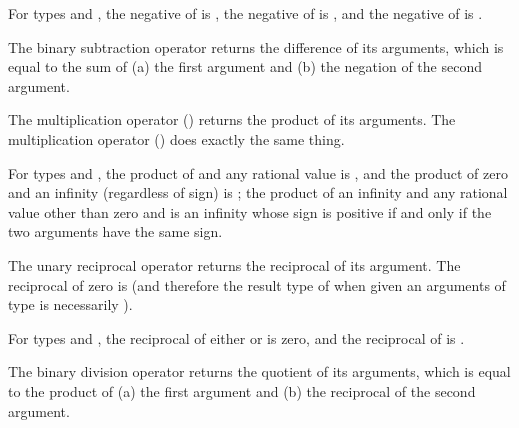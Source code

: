 For types  and , the negative of
\EXP{+\infty} is \EXP{-\infty}, the negative of \EXP{-\infty} is \EXP{+\infty},
and the negative of  is .



The binary subtraction operator \EXP{-} returns the difference of its arguments,
which is equal to the sum of (a) the first argument and (b) the negation of the second argument.



The multiplication operator \EXP{\cdot} () returns the product of its arguments.
The multiplication operator \EXP{\times} () does exactly the same thing.

For types  and , the product of
 and any rational value is , and the product of
zero and an infinity (regardless of sign) is ;
the product of an infinity and any rational value other than zero and 
is an infinity whose sign is positive if and only if the two arguments have the same sign.



The unary reciprocal operator \EXP{/} returns the reciprocal of its argument.
The reciprocal of zero is \EXP{+\infty} (and therefore the result type of \EXP{/}
when given an arguments of type  is necessarily ).

For types  and , the reciprocal of
either \EXP{+\infty} or \EXP{-\infty} is zero, and the reciprocal of  is .



The binary division operator \EXP{/} returns the quotient of its arguments,
which is equal to the product of (a) the first argument and (b) the reciprocal of the second argument.




